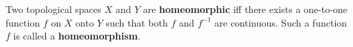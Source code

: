 Two topological spaces $X$ and $Y$ are \textbf{homeomorphic} iff there exists a one-to-one function $f$ on $X$ onto $Y$ such that both $f$ and $f^{-1}$ are continuous. Such a function $f$ is called a \textbf{homeomorphism}.
